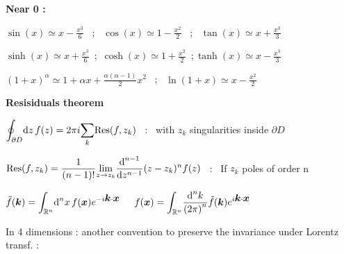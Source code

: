 
\item[] \textbf{Near 0 :}
\item $\sin(x) \simeq x - \frac{x^{3}}{6}$ \, ; \, $\cos(x) \simeq 1 - \frac{x^{2}}{2}$ \, ; \, $\tan(x) \simeq x + \frac{x^{3}}{3}$
\item $\sinh(x) \simeq x + \frac{x^{3}}{6}$  \,;\, $\cosh(x) \simeq 1 + \frac{x^{2}}{2}$   \,;\,$\tanh(x) \simeq x - \frac{x^{3}}{3}$
\item $\left(1+x \right)^{\alpha} \simeq 1 + \alpha x + \frac{\alpha(\alpha -1)}{2}x^2$ \, ; \, $\ln(1+x) \simeq x - \frac{x^2}{2} $ 
\item[] \textbf{Resisiduals theorem}
\item $\displaystyle{\oint_{\partial D}} \textrm{d} z \, f(z) = 2\pi i \displaystyle{\sum_{k}} \text{Res}(f,z_k)$ \, : \, with $z_k$ singularities inside $\partial D$  %

\item $\text{Res}(f,z_k) = \dfrac{1}{(n-1)!} \displaystyle{\lim_{z \rightarrow z_k}} \dfrac{\textrm{d} ^{n-1}}{\textrm{d} z^{n-1}} (z-z_k)^{n} f(z)$ \, : \, If $z_k$ poles of order n  
\squishend
{}

$\tilde{f}(\mbox{\boldmath$k$}) = \displaystyle{\int_{\mathbb{R}^n}} \textrm{d} ^n x \, f(\mbox{\boldmath$x$}) e^{-i\mbox{\boldmath$k$}\cdot\mbox{\boldmath$x$}}$ $ \quad f(\mbox{\boldmath$x$}) = \displaystyle{\int_{\mathbb{R}^n}} \dfrac{\textrm{d} ^n k}{\left(2\pi\right)^n} \tilde{f}(\mbox{\boldmath$k$})e^{i \mbox{\boldmath$k$}\cdot\mbox{\boldmath$x$}}$  

In 4 dimensions : another convention to preserve the invariance under Lorentz transf. : 

